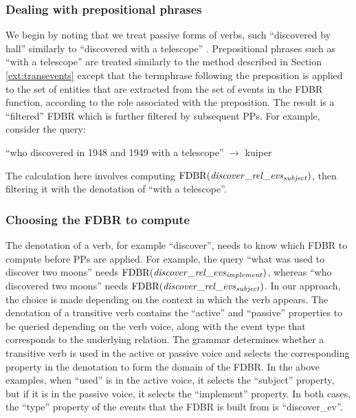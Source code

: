 \documentclass[../main.tex]{subfiles}
\begin{document}
\begin{refsection}
\subsubsection{Dealing with prepositional phrases}

We begin by noting that we treat passive forms of verbs, such ``discovered by hall'' similarly to
``discovered with a telescope'' \cite{peelar2016accommodating}. Prepositional phrases such as ``with a telescope'' are treated similarly to the method described in Section \ref{ext:transevents} except that
the termphrase following the preposition is applied to the set of entities that are extracted
from the set of events in the FDBR function, according to the role associated with the preposition. The
result is a ``filtered'' FDBR which is further filtered by subsequent PPs. For
example, consider the query:

``who discovered in 1948 and 1949 with a telescope'' $\rightarrow$ kuiper

The calculation here involves computing $\mathrm{FDBR}({\mathit{discover\_rel}\_\mathit{evs}_{\mathit{subject}}})$, then filtering it with the denotation of ``with a telescope''. %

\subsubsection{Choosing the FDBR to compute}
\label{ext:choosingfdbr}

The denotation of a verb, for example ``discover'', needs to know which FDBR to compute
before PPs are applied. For example, the query ``what was used to discover
two moons'' needs $\mathrm{FDBR}({\mathit{discover\_rel}\_\mathit{evs}_\mathit{implement}})$, whereas ``who discovered two moons'' needs
$\mathrm{FDBR}({\mathit{discover\_rel}\_\mathit{evs}_\mathit{subject}})$. In our approach, the choice is made depending on the context in
which the verb appears. The denotation of a transitive verb contains the ``active'' and ``passive'' properties to be queried depending
on the verb voice, along with the event type that corresponds to the underlying relation. The grammar determines whether a transitive verb is used in the active or passive voice and selects the corresponding property in the denotation to form the domain of the FDBR. In the above examples, when ``used'' is in the active voice, it selects the ``subject'' property, but if it is in the passive voice, it selects the ``implement'' property. In both cases, the ``type'' property of the events that the FDBR is built from is ``discover\_ev''.


\end{refsection}
\end{document}
